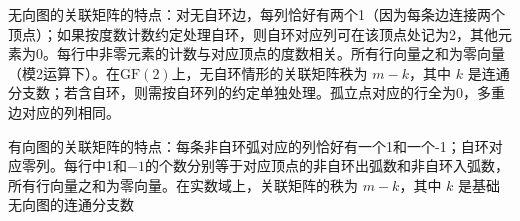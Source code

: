 \documentclass[lang=cn,11pt]{elegantbook}
\begin{document}
无向图的关联矩阵的特点：对无自环边，每列恰好有两个1（因为每条边连接两个顶点）；如果按度数计数约定处理自环，则自环对应列可在该顶点处记为2，其他元素为0。每行中非零元素的计数与对应顶点的度数相关。所有行向量之和为零向量（模2运算下）。在$\mathrm{GF}(2)$上，无自环情形的关联矩阵秩为 $m - k$，其中 $k$ 是连通分支数；若含自环，则需按自环列的约定单独处理。孤立点对应的行全为0，多重边对应的列相同。

有向图的关联矩阵的特点：每条非自环弧对应的列恰好有一个1和一个-1；自环对应零列。每行中1和$-1$的个数分别等于对应顶点的非自环出弧数和非自环入弧数，所有行向量之和为零向量。在实数域上，关联矩阵的秩为 $m - k$，其中 $k$ 是基础无向图的连通分支数














\newpage
\end{document}

